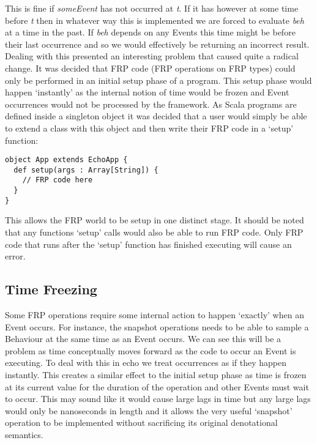       This is fine if \emph{someEvent} has not occurred at \emph{t}. If it has however at some time
      before \emph{t} then in whatever way this is implemented we are forced to evaluate \emph{beh}
      at a time in the past. If \emph{beh} depends on any Events this time might be before their
      last occurrence and so we would effectively be returning an incorrect result. Dealing with this
      presented an interesting problem that caused quite a radical change. It was decided that FRP
      code (FRP operations on FRP types) could only be performed in an initial setup phase of a program.
      This setup phase would happen `instantly' as the internal notion of time would be frozen and Event
      occurrences would not be processed by the framework. As Scala programs are defined inside a singleton
      object it was decided that a user would simply be able to extend a class with this object and then
      write their FRP code in a `setup' function:
 
\begin{verbatim}
object App extends EchoApp {
  def setup(args : Array[String]) {
    // FRP code here
  }
}
\end{verbatim}

      This allows the FRP world to be setup in one distinct stage. It should be noted that
      any functions `setup' calls would also be able to run FRP code. Only FRP code that runs
      after the `setup' function has finished executing will cause an error.
      
    \subsection{Time Freezing}
      Some FRP operations require some internal action to happen `exactly' when an Event occurs. For instance,
      the snapshot operations needs to be able to sample a Behaviour at the same time as an Event occurs.
      We can see this will be a problem as time conceptually moves forward as the code to
      occur an Event is executing. To deal with this in echo we treat occurrences as if they happen instantly. This
      creates a similar effect to the initial setup phase as time is frozen at its current value for the duration
      of the operation and other Events must wait to occur. This may sound like it would cause large lags in time
      but any large lags would only be nanoseconds in length and it allows the very useful `snapshot' operation
      to be implemented without sacrificing its original denotational semantics.
    
